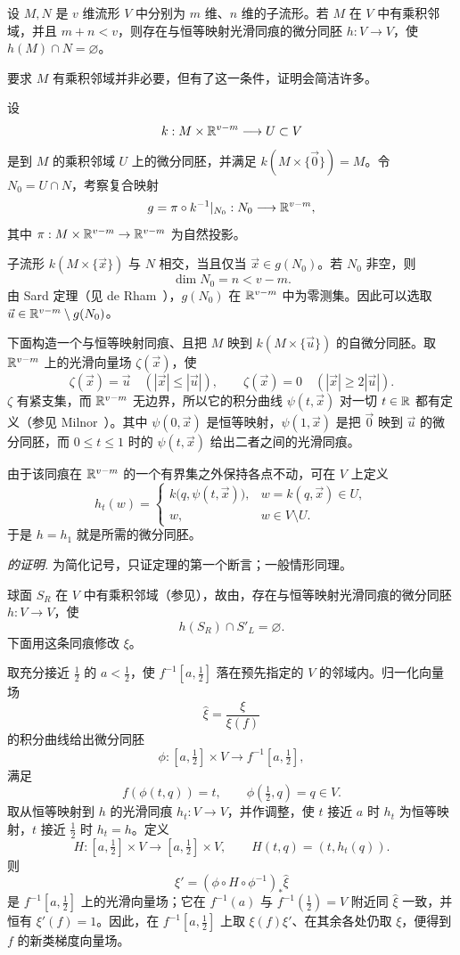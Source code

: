 设 $M,N$ 是 $v$ 维流形 $V$ 中分别为 $m$ 维、$n$ 维的子流形。若 $M$ 在 $V$ 中有乘积邻域，并且 $m+n<v$，则存在与恒等映射光滑同痕的微分同胚 $h:V\to V$，使 $h(M)\cap N=\varnothing$。

\Remark 要求 $M$ 有乘积邻域并非必要，但有了这一条件，证明会简洁许多。

\Proof 设
\[
  k:M\times\mathbb{R}^{v-m}\longrightarrow U\subset V
\]
是到 $M$ 的乘积邻域 $U$ 上的微分同胚，并满足
$k(M\times\{\vec 0\})=M$。令 $N_0=U\cap N$，考察复合映射
\[
  g=\pi\circ k^{-1}|_{N_0}:N_0\longrightarrow\mathbb{R}^{v-m},
\]
其中 $\pi:M\times\mathbb{R}^{v-m}\to\mathbb{R}^{v-m}$ 为自然投影。

子流形 $k(M\times\{\vec x\})$ 与 $N$ 相交，当且仅当 $\vec x\in g(N_0)$。若 $N_0$ 非空，则
\[
  \dim N_0=n<v-m.
\]
由 Sard 定理（见 de Rham~\cite[p.~10]{ref01}），$g(N_0)$ 在 $\mathbb{R}^{v-m}$ 中为零测集。因此可以选取
$\vec u\in\mathbb{R}^{v-m}\setminus g(N_0)$。

下面构造一个与恒等映射同痕、且把 $M$ 映到 $k(M\times\{\vec u\})$ 的自微分同胚。取 $\mathbb{R}^{v-m}$ 上的光滑向量场 $\zeta(\vec x)$，使
\[
  \zeta(\vec x)=\vec u\quad (|\vec x|\leq|\vec u|),
  \qquad
  \zeta(\vec x)=0\quad (|\vec x|\geq2|\vec u|).
\]
$\zeta$ 有紧支集，而 $\mathbb{R}^{v-m}$ 无边界，所以它的积分曲线
$\psi(t,\vec x)$ 对一切 $t\in\mathbb{R}$ 都有定义（参见 Milnor~\cite[p.~10]{ref04}）。其中 $\psi(0,\vec x)$ 是恒等映射，$\psi(1,\vec x)$ 是把 $\vec 0$ 映到 $\vec u$ 的微分同胚，而 $0\leq t\leq1$ 时的 $\psi(t,\vec x)$ 给出二者之间的光滑同痕。

由于该同痕在 $\mathbb{R}^{v-m}$ 的一个有界集之外保持各点不动，可在 $V$ 上定义
\[
  h_t(w)=
  \begin{cases}
    k\bigl(q,\psi(t,\vec x)\bigr),&w=k(q,\vec x)\in U,\\
    w,&w\in V\setminus U.
  \end{cases}
\]
于是 $h=h_1$ 就是所需的微分同胚。
\EndProof

\par\medskip\noindent\textit{ 的证明.}\quad
为简化记号，只证定理的第一个断言；一般情形同理。

球面 $S_R$ 在 $V$ 中有乘积邻域（参见），故由，存在与恒等映射光滑同痕的微分同胚 $h:V\to V$，使
\[
  h(S_R)\cap S'_L=\varnothing.
\]
下面用这条同痕修改 $\xi$。

取充分接近 $\tfrac12$ 的 $a<\tfrac12$，使 $f^{-1}[a,\tfrac12]$ 落在预先指定的 $V$ 的邻域内。归一化向量场
\[
  \widehat\xi=\frac{\xi}{\xi(f)}
\]
的积分曲线给出微分同胚
\[
  \phi:[a,\tfrac12]\times V\longrightarrow f^{-1}[a,\tfrac12],
\]
满足
\[
  f(\phi(t,q))=t,
  \qquad
  \phi(\tfrac12,q)=q\in V.
\]
取从恒等映射到 $h$ 的光滑同痕 $h_t:V\to V$，并作调整，使 $t$ 接近 $a$ 时 $h_t$ 为恒等映射，$t$ 接近 $\tfrac12$ 时 $h_t=h$。定义
\[
  H:[a,\tfrac12]\times V\longrightarrow[a,\tfrac12]\times V,
  \qquad
  H(t,q)=(t,h_t(q)).
\]
则
\[
  \xi'=(\phi\circ H\circ\phi^{-1})_*\widehat\xi
\]
是 $f^{-1}[a,\tfrac12]$ 上的光滑向量场；它在 $f^{-1}(a)$ 与 $f^{-1}(\tfrac12)=V$ 附近同 $\widehat\xi$ 一致，并恒有 $\xi'(f)=1$。因此，在 $f^{-1}[a,\tfrac12]$ 上取 $\xi(f)\xi'$、在其余各处仍取 $\xi$，便得到 $f$ 的新类梯度向量场。

